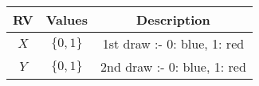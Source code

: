 
\begin{center}
    \begin{tabular}{|c|c|c|}
    \hline
    \textbf{RV}& \textbf{Values} & \textbf{Description} \\ \hline
    $X$		   & 	$\{0,1\}$	&  1st draw :- 0: blue, 1: red\\ \hline
    $Y$ 		   & 	$\{0,1\}$	&  2nd draw :- 0: blue, 1: red\\ \hline
    \end{tabular}
    \end{center}